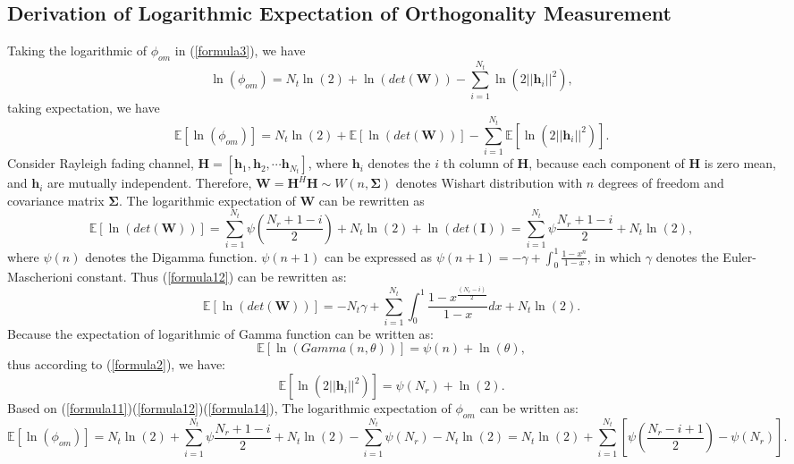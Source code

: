 \documentclass[12pt,letter,final]{article}
\begin{document}
\begin{spacing}{2.5}
\section{Derivation of Logarithmic Expectation of Orthogonality Measurement}
Taking the logarithmic of $\phi_{om}$ in (\ref{formula3}), we have 
\begin{equation}
\ln(\phi_{om})=N_{t}\ln(2)+\ln(det(\mathbf{W}))-\sum_{i=1}^{N_{t}}\ln(2||\mathbf{h}_{i}||^{2}),
\label{formula10}
\end{equation}
taking expectation, we have 
\begin{equation}
\mathbb{E}[\ln(\phi_{om})]=N_{t}\ln(2)+\mathbb{E}[\ln(det(\mathbf{W}))]-\sum_{i=1}^{N_{t}}\mathbb{E}[\ln(2||\mathbf{h}_{i}||^{2})].
\label{formula11}
\end{equation}
Consider Rayleigh fading channel, $\mathbf{H}=[\mathbf{h}_{1},\mathbf{h}_{2},\cdots \mathbf{h}_{N_{t}}]$, where $\mathbf{h}_{i}$ denotes the $i$ th column of $\mathbf{H}$, because each component of $\mathbf{H}$ is zero mean, and $\mathbf{h}_{i}$ are mutually independent. Therefore, $\mathbf{W}=\mathbf{H}^{H}\mathbf{H}\sim W(n, \mathbf{\Sigma})$ denotes Wishart distribution with $n$ degrees of freedom and covariance matrix $\mathbf{\Sigma}$. The logarithmic expectation of $\mathbf{W}$ can be rewritten as \cite{bishop2006pattern}
\begin{equation}
\mathbb{E}[\ln(det(\mathbf{W}))]=\sum_{i=1}^{N_{t}}\psi(\frac{N_{r}+1-i}{2})+N_{t}\ln(2)+\ln(det(\mathbf{I}))=\sum_{i=1}^{N_{t}}\psi{\frac{N_{r}+1-i}{2}}+N_{t}\ln(2),
\label{formula12}
\end{equation}
where $\psi(n)$ denotes the Digamma function. $\psi(n+1)$ can be expressed as $\psi(n+1)=-\gamma+\int_{0}^{1}\frac{1-x^{n}}{1-x}$, in which $\gamma$ denotes the Euler-Mascherioni constant. Thus (\ref{formula12}) can be rewritten as:
\begin{equation}
\mathbb{E}[\ln(det(\mathbf{W}))]=-N_{t}\gamma+\sum_{i=1}^{N_{t}}\int_{0}^{1}\frac{1-x^{\frac{(N_{r}-i)}{2}}}{1-x}dx+N_{t}\ln(2).
\label{formula13}
\end{equation} 
Because the expectation of logarithmic of Gamma function can be written as:
\begin{equation}
\mathbb{E}[\ln(Gamma(n,\theta))]=\psi(n)+\ln(\theta),
\end{equation}
thus according to (\ref{formula2}), we have:
\begin{equation}
\mathbb{E}[\ln(2||\mathbf{h}_{i}||^{2})]=\psi(N_{r})+\ln(2).
\label{formula14}
\end{equation}
Based on (\ref{formula11})(\ref{formula12})(\ref{formula14}), The logarithmic expectation of $\phi_{om}$ can be written as:
\begin{equation}
\mathbb{E}[\ln(\phi_{om})]=N_{t}\ln(2)+\sum_{i=1}^{N_{t}}\psi{\frac{N_{r}+1-i}{2}}+N_{t}\ln(2)-\sum_{i=1}^{N_{t}}\psi(N_{r})-N_{t}\ln(2)=N_{t}\ln(2)+\sum_{i=1}^{N_{t}}[\psi(\frac{N_{r}-i+1}{2})-\psi(N_{r})].
\label{formula15}
\end{equation}

\end{spacing}
\end{document}
